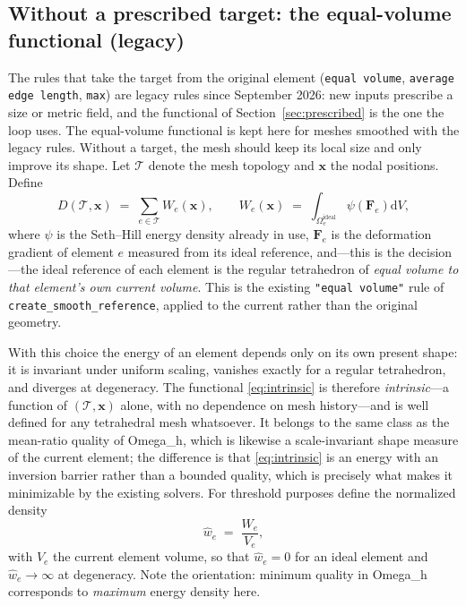 \documentclass[11pt]{article}
\newcommand{\dd}{\mathrm{d}}
\newcommand{\code}[1]{\texttt{#1}}
\newcommand{\bs}[1]{\boldsymbol{#1}}
\newcommand{\omegah}{Omega\_h}
\begin{document}
\subsection{Without a prescribed target: the equal-volume functional (legacy)}

The rules that take the target from the original element (\code{equal
volume}, \code{average edge length}, \code{max}) are legacy rules since
September 2026: new inputs prescribe a size or metric field, and the
functional of Section~\ref{sec:prescribed} is the one the loop uses. The
equal-volume functional is kept here for meshes smoothed with the legacy
rules. Without a target, the mesh should keep its local size and only
improve its shape. Let $\mathcal{T}$ denote the mesh topology and $\bs{x}$ the
nodal positions. Define
\begin{equation}
D(\mathcal{T}, \bs{x}) \;=\; \sum_{e \in \mathcal{T}} W_e(\bs{x}),
\qquad
W_e(\bs{x}) \;=\; \int_{\Omega_e^{\text{ideal}}}
\psi\!\left(\bs{F}_e\right) \dd V,
\label{eq:intrinsic}
\end{equation}
where $\psi$ is the Seth--Hill energy density already in use,
$\bs{F}_e$ is the deformation gradient of element $e$ measured from its
ideal reference, and---this is the decision---the ideal reference of each
element is the regular tetrahedron of \emph{equal volume to that
element's own current volume}. This is the existing \code{"equal
volume"} rule of \code{create\_smooth\_reference}, applied to the
current rather than the original geometry.

With this choice the energy of an element depends only on its own
present shape: it is invariant under uniform scaling, vanishes exactly
for a regular tetrahedron, and diverges at degeneracy. The functional
\eqref{eq:intrinsic} is therefore \emph{intrinsic}---a function of
$(\mathcal{T}, \bs{x})$ alone, with no dependence on mesh history---and
is well defined for any tetrahedral mesh whatsoever. It belongs to the
same class as the mean-ratio quality of \omegah{}, which is likewise a
scale-invariant shape measure of the current element; the difference is
that \eqref{eq:intrinsic} is an energy with an inversion barrier rather
than a bounded quality, which is precisely what makes it minimizable by
the existing solvers. For threshold purposes define the normalized
density
\begin{equation}
\hat{w}_e \;=\; \frac{W_e}{V_e},
\label{eq:density}
\end{equation}
with $V_e$ the current element volume, so that $\hat{w}_e = 0$ for an
ideal element and $\hat{w}_e \to \infty$ at degeneracy. Note the
orientation: minimum quality in \omegah{} corresponds to
\emph{maximum} energy density here.
\end{document}
